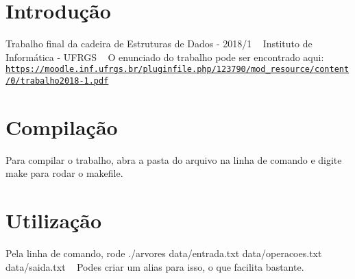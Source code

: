 \hypertarget{index_intro_sec}{}\section{Introdução}\label{index_intro_sec}
Trabalho final da cadeira de Estruturas de Dados -\/ 2018/1 ~\newline
 Instituto de Informática -\/ U\+F\+R\+GS ~\newline
 O enunciado do trabalho pode ser encontrado aqui\+: \href{https://moodle.inf.ufrgs.br/pluginfile.php/123790/mod_resource/content/0/trabalho2018-1.pdf}{\tt https\+://moodle.\+inf.\+ufrgs.\+br/pluginfile.\+php/123790/mod\+\_\+resource/content/0/trabalho2018-\/1.\+pdf}\hypertarget{index_install_sec}{}\section{Compilação}\label{index_install_sec}
Para compilar o trabalho, abra a pasta do arquivo na linha de comando e digite {\ttfamily make} para rodar o makefile.\hypertarget{index_utiliz_sec}{}\section{Utilização}\label{index_utiliz_sec}
Pela linha de comando, rode {\ttfamily ./arvores data/entrada.\+txt data/operacoes.\+txt data/saida.\+txt} ~\newline
Podes criar um alias para isso, o que facilita bastante.